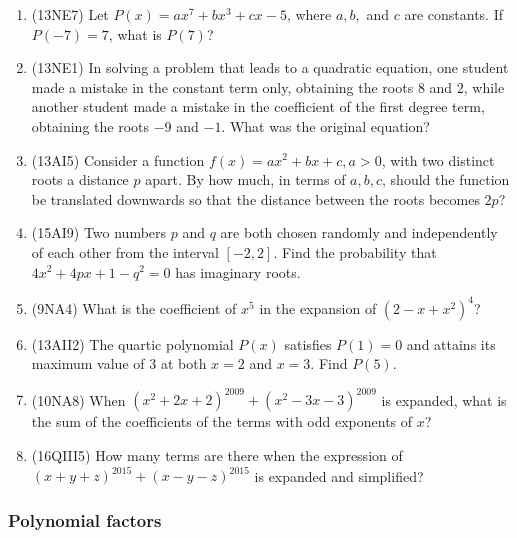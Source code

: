 \documentclass[10pt,paper=letter]{scrartcl}
\begin{document}
\begin{enumerate}

\item (13NE7) Let $P(x) = ax^7 + bx^3 + cx - 5$, where $a, b,$ and $c$ are constants. If $P(-7) = 7$, what is $P(7)$?

\item (13NE1) In solving a problem that leads to a quadratic equation, one student made a mistake in the constant term only, obtaining the roots $8$ and $2$, while another student made a mistake in the coefficient of the first degree term, obtaining the roots $-9$ and $-1$. What was the original equation?

\item (13AI5) Consider a function $f(x) = ax^2 + bx + c, a > 0$, with two distinct roots a distance $p$ apart. By how much, in terms of $a, b, c$, should the function be translated downwards so that the distance between the roots becomes $2p$?

\item (15AI9) Two numbers $p$ and $q$ are both chosen randomly and independently of each other from the interval $[-2,2]$. Find the probability that $4x^2 + 4px + 1 - q^2 = 0$ has imaginary roots.

\item (9NA4) What is the coefficient of $x^5$ in the expansion of $(2 - x + x^2)^4$?

\item (13AII2) The quartic polynomial $P(x)$ satisfies $P(1) = 0$ and attains its maximum value of $3$ at both $x = 2$ and $x = 3$. Find $P(5)$.

\item (10NA8) When $(x^2 + 2x + 2)^{2009} + (x^2 - 3x - 3)^{2009}$ is expanded, what is the sum of the coefficients of the terms with odd exponents of $x$?

\item (16QIII5) How many terms are there when the expression of $(x+y+z)^{2015} + (x-y-z)^{2015}$ is expanded and simplified? 

\end{enumerate}

\subsubsection*{Polynomial factors}
\end{document}
